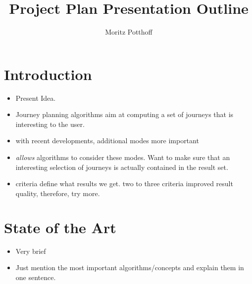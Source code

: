 \documentclass[a4paper,USenglish,cleveref, autoref, thm-restate]{lipics-v2021}
\title{Project Plan Presentation Outline}
\author{Moritz Potthoff}{Matrikelnummer 2157766}{moritz.potthoff@student.kit.edu}{}{}
\begin{document}
\maketitle

\begin{abstract}
\end{abstract}

\section{Introduction}
\begin{itemize}
    \item Present Idea.
    \item Journey planning algorithms aim at computing a set of journeys that is interesting to the user.
    \item with recent developments, additional modes more important
    \item \emph{allows} algorithms to consider these modes. Want to make sure that an interesting selection of journeys is actually contained in the result set.
    \item criteria define what results we get. two to three criteria improved result quality, therefore, try more.
\end{itemize}

\section{State of the Art}
\begin{itemize}
    \item Very brief
    \item Just mention the most important algorithms/concepts and explain them in one sentence.
\end{itemize}
\end{document}
